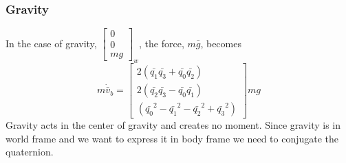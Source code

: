 \subsubsection{Gravity}
In the case of gravity, $\left[\begin{smallmatrix}0\\0\\mg\end{smallmatrix}\right]_w$, the force, $m \bar{g}$, becomes
\begin{equation}
m \dot{\bar{v}}_b = \left[ \begin{matrix}
    2 (\bar{q_1} \bar{q_3} + \bar{q_0} \bar{q_2})  \\
    2 (\bar{q_2} \bar{q_3} - \bar{q_0} \bar{q_1})  \\
    (\bar{q_0}^2 - \bar{q_1}^2 - \bar{q_2}^2 + \bar{q_3}^2) 
    \end{matrix} \right] m g
\end{equation}
Gravity acts in the center of gravity and creates no moment.
Since gravity is in world frame and we want to express it in body frame we need to conjugate the quaternion.